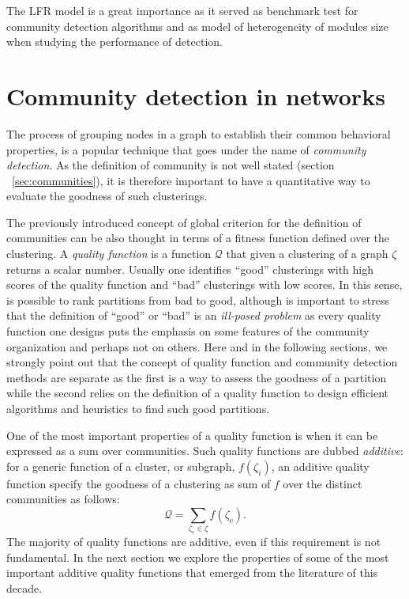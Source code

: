The LFR model is a great importance as it served as benchmark test for community detection algorithms and as model of heterogeneity of modules size when studying the performance of detection.

\section{Community detection in networks}
\label{sec:communitydetectioninnetworks}
The process of grouping nodes in a graph to establish their common behavioral properties, is a popular technique that goes under the name of \emph{community detection}.
As the definition of community is not well stated (section ~\ref{sec:communities}), it is therefore important to have a quantitative way to evaluate the goodness of such clusterings.

The previously introduced concept of global criterion for the definition of communities can be also thought in terms of a fitness function defined over the clustering.
A \emph{quality function} is a function $\mathcal{Q}$ that given a clustering of a graph $\zeta$ returns a scalar number. Usually one identifies ``good'' clusterings with high scores of the quality function and ``bad'' clusterings with low scores. In this sense, is possible to rank partitions from bad to good, although is important to stress that the definition of ``good'' or ``bad'' is an \emph{ill-posed problem} as every quality function one designs puts the emphasis on some features of the community organization and perhaps not on others. 
Here and in the following sections, we strongly point out that the concept of quality function and community detection methods are separate as the first is a way to assess the goodness of a partition while the second relies on the definition of a quality function to design efficient algorithms and heuristics to find such good partitions.

One of the most important properties of a quality function is when it can be expressed as a sum over communities. Such quality functions are dubbed \emph{additive}: for a generic function of a cluster, or subgraph, $f(\zeta_i)$, an additive quality function specify the goodness of a clustering as sum of $f$ over the distinct communities as follows:
\begin{equation}\label{eq:additive_quality}
\mathcal{Q} = \sum \limits_{\zeta_c \in \zeta} f(\zeta_c).
\end{equation}
The majority of quality functions are additive, even if this requirement is not fundamental. In the next section we explore the properties of some of the most important additive quality functions that emerged from the literature of this decade.

